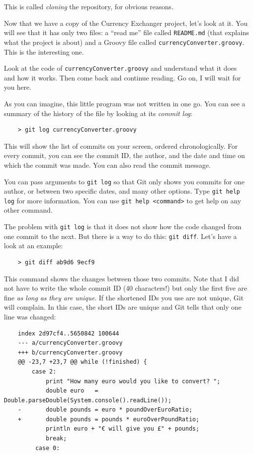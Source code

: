 This is called \emph{cloning} the repository, for obvious reasons. 

Now that we have a copy of the Currency Exchanger project, let's look
at it. You will see that it has only two files: a ``read me'' file
called \verb+README.md+ (that explains what the project is about) and
a Groovy file called \verb+currencyConverter.groovy+. This is the
interesting one. 

Look at the code of \verb+currencyConverter.groovy+ and understand
what it does and how it works. Then come back and continue reading. Go
on, I will wait for you here. 

As you can imagine, this little program was not written in one go. You
can see a summary of the history of the file by looking at its
\emph{commit log}: 

\begin{verbatim}
    > git log currencyConverter.groovy
\end{verbatim}

This will show the list of commits on your screen, ordered
chronologically. For every commit, you can see the commit ID, the
author, and the date and time on which the commit was made. You can
also read the commit message. 

You can pass arguments to \verb+git log+ so that Git only shows you
commits for one author, or between two specific dates, and many
other options. Type \verb+git help log+ for more information. You can
use \verb+git help <command>+ to get help on any other command. 

The problem with \verb+git log+ is that it does not show how the code
changed from one commit to the next. But there is a way to do this:
\verb+git diff+. Let's have a look at an example: 

\begin{verbatim}
    > git diff ab9d6 9ecf9
\end{verbatim}

This command shows the changes between those two commits. Note that I
did not have to write the whole commit ID (40 characters!) but only
the first five are fine \emph{as long as they are unique}. If the
shortened IDs you use are not unique, Git will complain. In this case,
the short IDs are unique and Git tells that only one line was changed: 

\begin{verbatim}
    index 2d97cf4..5650842 100644
    --- a/currencyConverter.groovy
    +++ b/currencyConverter.groovy
    @@ -23,7 +23,7 @@ while (!finished) {
        case 2: 
            print "How many euro would you like to convert? ";
            double euro   = Double.parseDouble(System.console().readLine());
    -       double pounds = euro * poundOverEuroRatio;
    +       double pounds = pounds * euroOverPoundRatio;
            println euro + "€ will give you £" + pounds;
            break;
         case 0:  
\end{verbatim}

